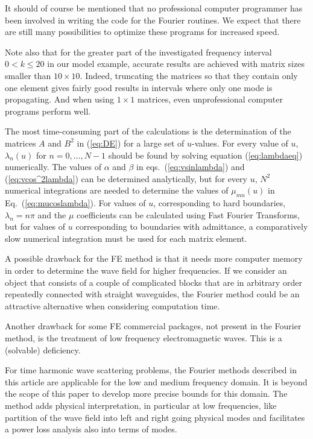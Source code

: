 \documentclass[numreferences]{kluwer}
\begin{document}
It should of course be mentioned that no professional computer
programmer has been involved in writing the code for the Fourier
routines. We expect that there are still many possibilities to optimize
these programs for increased speed.

Note also that
for the greater part of the investigated frequency interval $0<k\le20$
in our model example, accurate results are achieved with matrix sizes
smaller than $10\times10$. Indeed, 
truncating the matrices so that they contain only one
element gives fairly good results in intervals where only one
mode is propagating. And when using $1\times1$ matrices, even
unprofessional computer programs perform well. 

The most time-consuming part of the calculations is the determination
of the matrices $A$ and $B^2$ in (\ref{eq:DE}) for a large set of
$u$-values. For every value of $u$, $\lambda_n(u)$ for $n=0,\dots,N-1$
should be found by solving equation (\ref{eq:lambdaeq}) numerically.
The values of $\alpha$ and $\beta$ in eqs.~(\ref{eq:vsinlambda}) and
(\ref{eq:vcos^2lambda}) can be determined analytically, but for every
$u$, $N^2$ numerical integrations are needed to determine the values
of $\mu_{mn}(u)$ in Eq.~(\ref{eq:mucoslambda}). For values of $u$,
corresponding to hard boundaries, $\lambda_n=n\pi$ and the $\mu$
coefficients can be calculated using Fast Fourier Transforms, but for
values of $u$ corresponding to boundaries with admittance, a
comparatively slow numerical integration must be used for each matrix
element.

A possible drawback for the FE method is that it needs more computer
memory in order to determine the wave field for higher frequencies.
If we consider an object that consists of a couple of complicated
blocks that are in arbitrary order repeatedly connected with straight
waveguides, the Fourier method could be an attractive alternative when
considering computation time.

Another drawback for some FE commercial packages, not present in the
Fourier method, is the treatment of low frequency
electromagnetic waves. This is a (solvable)
\cite{AndriulliCoolsOlyslagerMichielssen2008,chew2014} deficiency.

For time harmonic wave scattering problems, the Fourier methods
described in this article are applicable for the low and medium
frequency domain. It is beyond the scope of this paper to develop more
precise bounds for this domain. The method adds physical
interpretation, in particular at low frequencies, like partition of
the wave field into left and right going physical modes and
facilitates a power loss analysis also into terms of modes.
\end{document}
